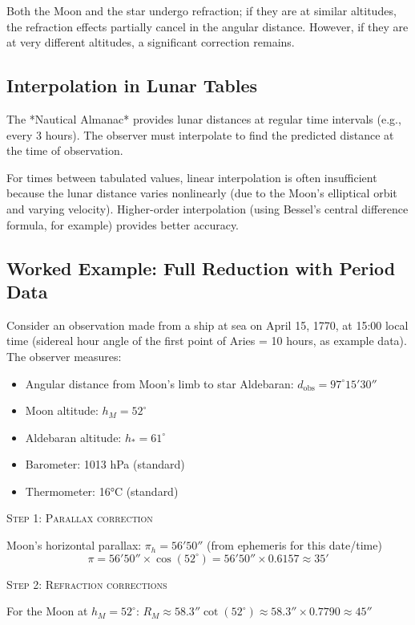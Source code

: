 Both the Moon and the star undergo refraction; if they are at similar altitudes, the refraction effects partially cancel in the angular distance. However, if they are at very different altitudes, a significant correction remains.

\subsection*{Interpolation in Lunar Tables}

The *Nautical Almanac* provides lunar distances at regular time intervals (e.g., every 3 hours). The observer must interpolate to find the predicted distance at the time of observation.

For times between tabulated values, linear interpolation is often insufficient because the lunar distance varies nonlinearly (due to the Moon's elliptical orbit and varying velocity). Higher-order interpolation (using Bessel's central difference formula, for example) provides better accuracy.

\subsection*{Worked Example: Full Reduction with Period Data}

Consider an observation made from a ship at sea on April 15, 1770, at 15:00 local time (sidereal hour angle of the first point of Aries = 10 hours, as example data). The observer measures:
\begin{itemize}
  \item Angular distance from Moon's limb to star Aldebaran: $d_{\text{obs}} = 97^{\circ} 15' 30''$
  \item Moon altitude: $h_M = 52^{\circ}$
  \item Aldebaran altitude: $h_*= 61^{\circ}$
  \item Barometer: 1013 hPa (standard)
  \item Thermometer: 16°C (standard)
\end{itemize}

\textsc{Step 1: Parallax correction}

Moon's horizontal parallax: $\pi_h = 56' 50''$ (from ephemeris for this date/time)
\[
  \pi = 56' 50'' \times \cos(52^{\circ}) = 56' 50'' \times 0.6157 \approx 35'
\]

\textsc{Step 2: Refraction corrections}

For the Moon at $h_M = 52^{\circ}$: $R_M \approx 58.3'' \cot(52^{\circ}) \approx 58.3'' \times 0.7790 \approx 45''$

